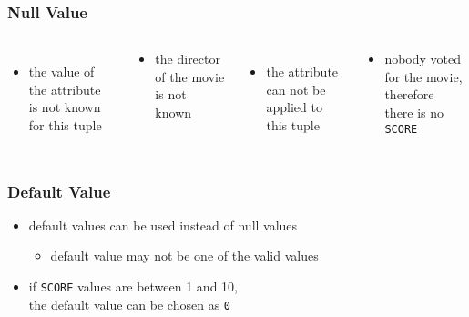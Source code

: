 \documentclass[dvipsnames]{beamer}
\theoremstyle{plain}
\begin{document}
\begin{frame}
  \frametitle{Null Value}

  \begin{columns}[t]
    \begin{itemize}
      \item the value of the attribute\\
	is not known for this tuple
    \end{itemize}

    \begin{example}
      \begin{itemize}
        \item the director of the movie\\
	  is not known
      \end{itemize}
    \end{example}

    \pause
    \begin{itemize}
      \item the attribute can not be\\
	applied to this tuple
    \end{itemize}

    \begin{example}
      \begin{itemize}
        \item nobody voted for the movie,\\
	  therefore there is no \texttt{SCORE}
      \end{itemize}
    \end{example}
  \end{columns}
\end{frame}

\begin{frame}
  \frametitle{Default Value}

  \begin{itemize}
    \item default values can be used instead of null values
    \begin{itemize}
      \item default value may not be one of the valid values
    \end{itemize}
  \end{itemize}

  \pause
  \begin{example}
    \begin{itemize}
      \item if \texttt{SCORE} values are between 1 and 10,\\
	the default value can be chosen as \texttt{0}
    \end{itemize}
  \end{example}
\end{frame}
\end{document}
